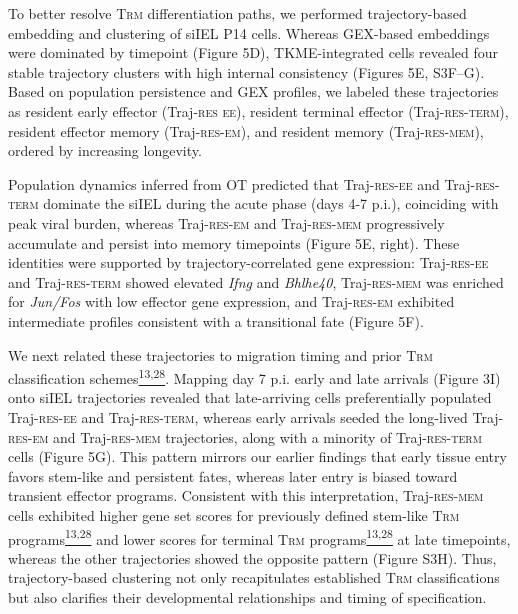 To better resolve T\textsc{rm} differentiation paths, we performed
trajectory-based embedding and clustering of siIEL P14 cells. Whereas
GEX-based embeddings were dominated by timepoint (Figure 5D),
TKME-integrated cells revealed four stable trajectory clusters with high
internal consistency (Figures 5E, S3F--G). Based on population
persistence and GEX profiles, we labeled these trajectories as resident
early effector (Traj-\textsc{res ee}), resident terminal effector
(Traj-\textsc{res-term}), resident effector memory
(Traj-\textsc{res-em}), and resident memory (Traj-\textsc{res-mem}),
ordered by increasing longevity.

Population dynamics inferred from OT predicted that Traj-\textsc{res-ee}
and Traj-\textsc{res-term} dominate the siIEL during the acute phase
(days 4-7 p.i.), coinciding with peak viral burden, whereas
Traj-\textsc{res-em} and Traj-\textsc{res-mem} progressively accumulate
and persist into memory timepoints (Figure 5E, right). These identities
were supported by trajectory-correlated gene expression:
Traj-\textsc{res-ee} and Traj-\textsc{res-term} showed elevated
\emph{Ifng} and \emph{Bhlhe40}, Traj-\textsc{res-mem} was enriched for
\emph{Jun/Fos} with low effector gene expression, and
Traj-\textsc{res-em} exhibited intermediate profiles consistent with a
transitional fate (Figure 5F).

We next related these trajectories to migration timing and prior
T\textsc{rm} classification
schemes\href{https://sciwheel.com/work/citation?ids=8917053,17425314\&pre=\&pre=\&suf=\&suf=\&sa=0,0\&dbf=0\&dbf=0}{\textsuperscript{13,28}}.
Mapping day 7 p.i. early and late arrivals (Figure 3I) onto siIEL
trajectories revealed that late-arriving cells preferentially populated
Traj-\textsc{res-ee} and Traj-\textsc{res-term}, whereas early arrivals
seeded the long-lived Traj-\textsc{res-em} and Traj-\textsc{res-mem}
trajectories, along with a minority of Traj-\textsc{res-term} cells
(Figure 5G). This pattern mirrors our earlier findings that early tissue
entry favors stem-like and persistent fates, whereas later entry is
biased toward transient effector programs. Consistent with this
interpretation, Traj-\textsc{res-mem} cells exhibited higher gene set
scores for previously defined stem-like T\textsc{rm}
programs\href{https://sciwheel.com/work/citation?ids=8917053,17425314\&pre=\&pre=\&suf=\&suf=\&sa=0,0\&dbf=0\&dbf=0}{\textsuperscript{13,28}}
and lower scores for terminal T\textsc{rm}
programs\href{https://sciwheel.com/work/citation?ids=8917053,17425314\&pre=\&pre=\&suf=\&suf=\&sa=0,0\&dbf=0\&dbf=0}{\textsuperscript{13,28}}
at late timepoints, whereas the other trajectories showed the opposite
pattern (Figure S3H). Thus, trajectory-based clustering not only
recapitulates established T\textsc{rm} classifications but also
clarifies their developmental relationships and timing of specification.

